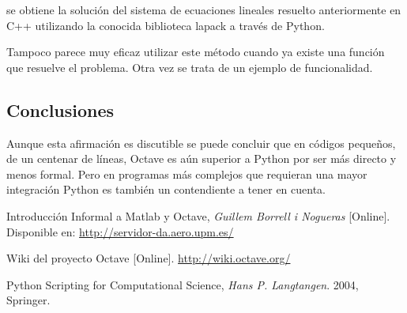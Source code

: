 \documentclass[10pt,letterpaper,conference]{ieeeconfspanish}
\begin{document}
se obtiene la solución del sistema de ecuaciones lineales resuelto
anteriormente en C++ utilizando la conocida biblioteca lapack a través
de Python.

Tampoco parece muy eficaz utilizar este método cuando ya existe una
función que resuelve el problema.  Otra vez se trata de un ejemplo de
funcionalidad.

\subsection*{Conclusiones}

Aunque esta afirmación es discutible se puede concluir que en códigos
pequeños, de un centenar de líneas, Octave es aún superior a Python
por ser más directo y menos formal.  Pero en programas más complejos
que requieran una mayor integración Python es también un contendiente
a tener en cuenta.


\begin{thebibliography}{1}
Introducción Informal a Matlab y Octave, \emph{Guillem Borrell i
  Nogueras} [Online]. Disponible en: \url{http://servidor-da.aero.upm.es/}

Wiki del proyecto Octave [Online]. \url{http://wiki.octave.org/}

Python Scripting for Computational Science, \emph{Hans
  P. Langtangen}. 2004, Springer.


\end{thebibliography}
\end{document}
